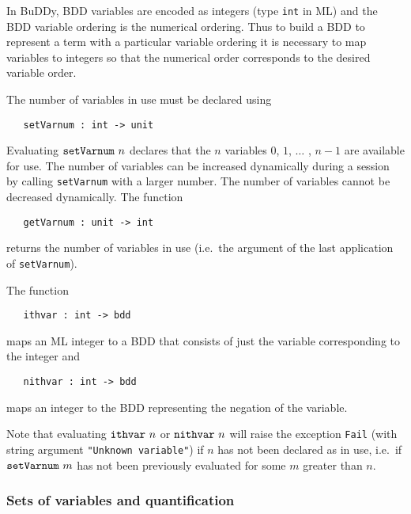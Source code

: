 \documentclass[12pt]{book}
\renewcommand{\t}[1]{\mbox{\tt #1}}
\newcommand{\Buddy}{BuDDy{}}
\begin{document}
In \Buddy{}, BDD variables are encoded as integers (type \t{int} in ML) and the BDD variable ordering
is the numerical ordering. Thus to build a BDD to represent a \HOL{} term with a
particular variable ordering it is necessary to map \HOL{} variables to
integers so that the numerical order corresponds to the desired
variable order.

The number of variables in use must be declared using

\begin{verbatim}
   setVarnum : int -> unit
\end{verbatim}

Evaluating $\t{setVarnum}~n$ declares that the $n$ variables $0$,
$1$, $\ldots$ , $n{-}1$ are available for use. The number of variables
can be increased dynamically during a session by calling \t{setVarnum}
with a larger number. The number of variables cannot be decreased
dynamically. The function

\begin{verbatim}
   getVarnum : unit -> int
\end{verbatim}

returns the number of variables in use (i.e.~the argument of the last
application of \t{setVarnum}).

The function

\begin{verbatim}
   ithvar : int -> bdd
\end{verbatim}

maps an ML integer to a BDD that consists of just the variable
corresponding to the integer and

\begin{verbatim}
   nithvar : int -> bdd
\end{verbatim}

maps
an integer to the BDD representing the negation of the variable.

Note that evaluating $\t{ithvar}~n$ or $\t{nithvar}~n$ will raise the exception
\t{Fail} (with string argument \texttt{"Unknown variable"})
if $n$ has not been declared as in use, i.e.~if
$\t{setVarnum}~m$ has not been previously evaluated for some $m$
greater than $n$.


\subsubsection{Sets of variables and quantification}\label{varSet}
\end{document}
